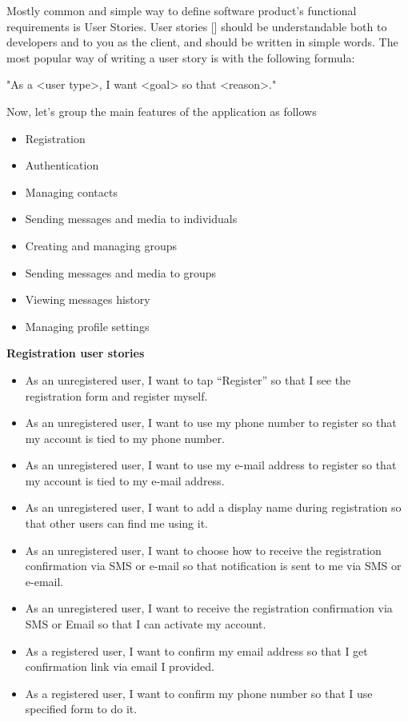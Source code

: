 Mostly common and simple way to define software product's functional requirements is User Stories.
User stories [\cite{cohn2004user}] should be understandable both to developers and to you as the client, and should be written in simple words.
The most popular way of writing a user story is with the following formula:

\begin{center}
    \begin{spverbatim}
        "As a <user type>, I want <goal> so that <reason>."
    \end{spverbatim}
\end{center}

Now, let’s group the main features of the application as follows

\begin{itemize}
    \item Registration
    \item Authentication
    \item Managing contacts
    \item Sending messages and media to individuals
    \item Creating and managing groups
    \item Sending messages and media to groups
    \item Viewing messages history
    \item Managing profile settings
\end{itemize}

\textbf{Registration user stories}
\begin{itemize}
    \item As an unregistered user, I want to tap “Register” so that I see the registration form and register myself.
    \item As an unregistered user, I want to use my phone number to register so that my account is tied to my phone number.
    \item As an unregistered user, I want to use my e-mail address to register so that my account is tied to my e-mail address.
    \item As an unregistered user, I want to add a display name during registration so that other users can find me using it.
    \item As an unregistered user, I want to choose how to receive the registration confirmation via SMS or e-mail so that
    notification is sent to me via SMS or e-email.
    \item As an unregistered user, I want to receive the registration confirmation via SMS or Email so that I can activate my account.
    \item As a registered user, I want to confirm my email address so that I get confirmation link via email I provided.
    \item As a registered user, I want to confirm my phone number so that I use specified form to do it.
\end{itemize}

